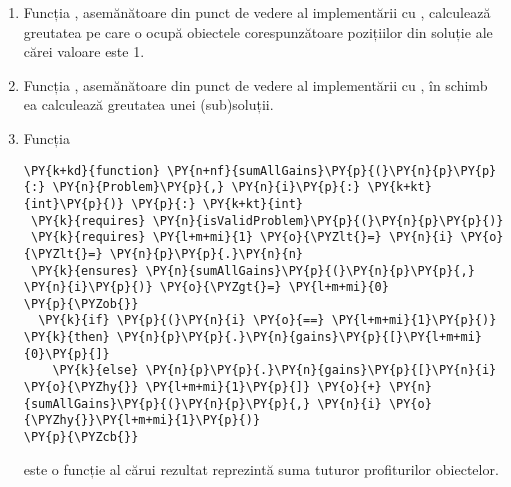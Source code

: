 \begin{sloppypar}
\begin{enumerate}
\begin{Verbatim}[commandchars=\\\{\}]
  \PY{k}{requires} \PY{l+m+mi}{0} \PY{o}{\PYZlt{}=} \PY{o}{|}\PY{n}{solution}\PY{o}{|} \PY{o}{\PYZlt{}=} \PY{o}{|}\PY{n}{p}\PY{p}{.}\PY{n}{gains}\PY{o}{|}
  \PY{k}{ensures} \PY{n}{computeGain}\PY{p}{(}\PY{n}{p}\PY{p}{,} \PY{n}{solution}\PY{p}{,} \PY{n}{i}\PY{p}{)} \PY{o}{\PYZgt{}=} \PY{l+m+mi}{0}
\PY{p}{\PYZob{}}
  \PY{k}{if} \PY{n}{i} \PY{o}{==} \PY{l+m+mi}{0} \PY{k}{then} \PY{n}{solution}\PY{p}{[}\PY{l+m+mi}{0}\PY{p}{]} \PY{o}{*} \PY{n}{p}\PY{p}{.}\PY{n}{gains}\PY{p}{[}\PY{l+m+mi}{0}\PY{p}{]} \PY{k}{else} 
  \PY{n}{solution}\PY{p}{[}\PY{n}{i}\PY{p}{]} \PY{o}{*} \PY{n}{p}\PY{p}{.}\PY{n}{gains}\PY{p}{[}\PY{n}{i}\PY{p}{]} \PY{o}{+} \PY{n}{computeGain}\PY{p}{(}\PY{n}{p}\PY{p}{,} \PY{n}{solution}\PY{p}{,} \PY{n}{i} \PY{o}{\PYZhy{}} \PY{l+m+mi}{1}\PY{p}{)}
\PY{p}{\PYZcb{}}
\end{Verbatim}
    spre deosebire de $gain$, poate primi o subsoluție al cărui profit se dorește a fi calculat prin specificarea unui index $i$ reprezentând poziția de la final spre început a subsoluției. Este o funcție recursivă a cărei finalitate este asigurată prin condiția $i == 0$.
    \item Funcția , asemănătoare din punct de vedere al implementării cu , calculează greutatea pe care o ocupă obiectele corespunzătoare pozițiilor din soluție ale cărei valoare este 1.
    \item Funcția , asemănătoare din punct de vedere al implementării cu , în schimb ea calculează greutatea unei (sub)soluții.
    \item Funcția 
    \begin{Verbatim}[commandchars=\\\{\}]
\PY{k+kd}{function} \PY{n+nf}{sumAllGains}\PY{p}{(}\PY{n}{p}\PY{p}{:} \PY{n}{Problem}\PY{p}{,} \PY{n}{i}\PY{p}{:} \PY{k+kt}{int}\PY{p}{)} \PY{p}{:} \PY{k+kt}{int}
 \PY{k}{requires} \PY{n}{isValidProblem}\PY{p}{(}\PY{n}{p}\PY{p}{)}
 \PY{k}{requires} \PY{l+m+mi}{1} \PY{o}{\PYZlt{}=} \PY{n}{i} \PY{o}{\PYZlt{}=} \PY{n}{p}\PY{p}{.}\PY{n}{n}
 \PY{k}{ensures} \PY{n}{sumAllGains}\PY{p}{(}\PY{n}{p}\PY{p}{,} \PY{n}{i}\PY{p}{)} \PY{o}{\PYZgt{}=} \PY{l+m+mi}{0}
\PY{p}{\PYZob{}}
  \PY{k}{if} \PY{p}{(}\PY{n}{i} \PY{o}{==} \PY{l+m+mi}{1}\PY{p}{)} \PY{k}{then} \PY{n}{p}\PY{p}{.}\PY{n}{gains}\PY{p}{[}\PY{l+m+mi}{0}\PY{p}{]} 
    \PY{k}{else} \PY{n}{p}\PY{p}{.}\PY{n}{gains}\PY{p}{[}\PY{n}{i} \PY{o}{\PYZhy{}} \PY{l+m+mi}{1}\PY{p}{]} \PY{o}{+} \PY{n}{sumAllGains}\PY{p}{(}\PY{n}{p}\PY{p}{,} \PY{n}{i} \PY{o}{\PYZhy{}}\PY{l+m+mi}{1}\PY{p}{)}
\PY{p}{\PYZcb{}}
\end{Verbatim} 
    este o funcție al cărui rezultat reprezintă suma tuturor profiturilor obiectelor.
\end{enumerate}


\end{sloppypar}
